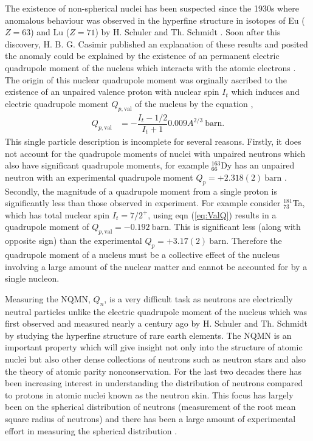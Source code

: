 \documentclass[10pt,a4paper, twoside, openright]{report}
\begin{document}
The existence of non-spherical nuclei has been suspected since the 1930s where anomalous behaviour was observed in the hyperfine structure in isotopes of Eu ($Z=63$) and Lu ($Z=71$) by H. Schuler and Th. Schmidt \cite{Schuler1935(1), Schuler1935(2)}. Soon after this discovery, H. B. G. Casimir published an explanation of these results and posited the anomaly could be explained by the existence of an permanent electric quadrupole moment of the nucleus which interacts with the atomic electrons \cite{Casimir1935, Casimir1936}. The origin of this nuclear quadrupole moment was orginally ascribed to the existence of an unpaired valence proton with nuclear spin $I_t$ which induces and electric quadrupole moment  $Q_{p,\text{val}}$ of the nucleus by the equation \cite{BohrMottVol1},
\begin{align}\label{eq:valQ}
Q_{p,\text{val}} &=  - \dfrac{I_t-1/2}{I_t + 1}0.009A^{2/3} \ \text{barn}.
\end{align}  
This single particle description is incomplete for several reasons. Firstly, it does not account for the quadrupole moments of nuclei with unpaired neutrons which also have significant quadrupole moments, for example $^{163}_{66}$Dy has an unpaired neutron with an experimental quadrupole moment $Q_p = +2.318(2) \ \text{barn}$ \cite{Stone2005}. Secondly, the magnitude of a quadrupole moment from a single proton is significantly less than those observed in experiment. For example consider $^{181}_{73}$Ta, which has total nuclear spin $I_t=7/2^{+}$, using eqn (\ref{eq:ValQ}) results in a quadrupole moment of $Q_{p,\text{val}} = -0.192 \ \text{barn}$. This is significant less (along with opposite sign) than the experimental $Q_p = +3.17(2) \ \text{barn}$. Therefore the quadrupole moment of a nucleus must be a collective effect of the nucleus involving a large amount of the nuclear matter and cannot be accounted for by a single nucleon. 

Measuring the NQMN, $Q_{n}$,  is a very difficult  task as neutrons are electrically neutral particles unlike the electric quadrupole moment of the nucleus which was first observed and measured nearly a century ago by H. Schuler and Th. Schmidt \cite{Schuler1935(1), Schuler1935(2), Casimir1935} by studying the hyperfine structure of rare earth elements. The NQMN is an important property which will give insight not only into the structure of  atomic nuclei but also other dense collections of neutrons such as neutron stars \cite{Brown2000, Furnstahl2002, Typel2001, Reinhard2010} and also the theory of atomic parity nonconservation. For the last two decades there has been increasing interest in understanding the distribution of neutrons compared to protons in atomic nuclei known as the neutron skin. This focus has largely been on the spherical distribution of neutrons (measurement of the root mean square radius of neutrons) and there has been a large amount of experimental effort in measuring the spherical distribution \cite{Clark2003, Trzcinska2001, Lenske2009, Abrahamyan2012}. 
\end{document}
